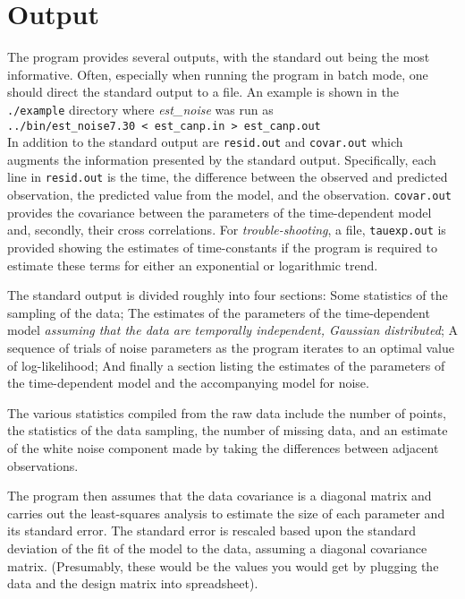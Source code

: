\documentclass[12pt]{amsart}
\begin{document}
\section{Output}

The program provides several outputs, with the standard out being the most informative. Often, especially
when running the program in batch mode, one should direct the standard output to a file. An example
is shown in the \texttt{./example} directory where \textit{est\_noise} was run as \\
\texttt{../bin/est\_noise7.30 < est\_canp.in > est\_canp.out} \\
In addition to the standard output are \texttt{resid.out} and \texttt{covar.out} which augments the information
presented by the standard output. Specifically, each line in \texttt{resid.out} is the time, the difference
between the observed and predicted observation, the predicted value from the model, and the observation.
\texttt{covar.out} provides the covariance between the parameters of the time-dependent model and, secondly,
their cross correlations.  For \textit{trouble-shooting}, a file, \texttt{tauexp.out} is provided showing the estimates
of time-constants if the program is required to estimate these terms for either an exponential or logarithmic trend.

The standard output is divided roughly into four sections: Some statistics of the sampling of the data; The estimates
of the parameters of the time-dependent model \textit{assuming that the data are temporally independent, Gaussian
distributed}; A sequence of trials of noise parameters as the program iterates to an optimal value of log-likelihood;
And finally a section listing the estimates of the parameters of the time-dependent model and the accompanying
model for noise.

The various statistics compiled from the raw data include the number of points, the statistics of the data sampling,
the number of missing data, and an estimate of the white noise component made by taking the differences
between adjacent observations.

The program then assumes that the data covariance is a diagonal matrix and carries out the least-squares analysis
to estimate the size of each parameter and its standard error.  The standard error is rescaled based upon the
standard deviation of the fit of the model to the data, assuming a diagonal covariance matrix. (Presumably,
these would be the values you would get by plugging the data and the design matrix into spreadsheet).
\end{document}
